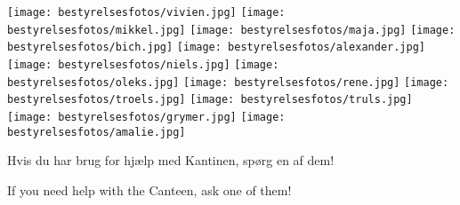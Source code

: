 \documentclass{article}
\begin{document}
\maketitle

\vspace{-0.5cm}

\english
\vspace{-18mm}
\dansk
\vspace{-10mm}

\begin{center}

\texttt{[image: bestyrelsesfotos/vivien.jpg]}
\texttt{[image: bestyrelsesfotos/mikkel.jpg]}
\texttt{[image: bestyrelsesfotos/maja.jpg]}
\texttt{[image: bestyrelsesfotos/bich.jpg]}
\texttt{[image: bestyrelsesfotos/alexander.jpg]}
\texttt{[image: bestyrelsesfotos/niels.jpg]}
\texttt{[image: bestyrelsesfotos/oleks.jpg]}
\texttt{[image: bestyrelsesfotos/rene.jpg]}
\texttt{[image: bestyrelsesfotos/troels.jpg]}
\texttt{[image: bestyrelsesfotos/truls.jpg]}
\texttt{[image: bestyrelsesfotos/grymer.jpg]}
\texttt{[image: bestyrelsesfotos/amalie.jpg]}

\end{center}

\noindent Hvis du har brug for hjælp med Kantinen, spørg en af dem!

\english
If you need help with the Canteen, ask one of them!

\dansk
\underskriv
\end{document}
